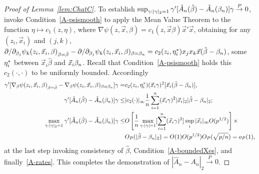\documentclass{article}
\theoremstyle{remark}
\begin{document}
\begin{proof}[Proof of Lemma~\ref{lem:ChatC}]
To establish $\sup_{\gamma: |\gamma|_{2}=1}\gamma'[\hat{A}_{n}(\hat\beta) - \hat{A}_{n}(\beta_{n }) ]\gamma  \stackrel{P}{\rightarrow} 0$,  invoke Condition~\ref{A-psismooth} to apply the Mean Value Theorem to the function $\eta \mapsto c_{1}(z, \eta)$, where $\nabla \psi(z, \vec{x}, \beta)  = c_{1}(z, \vec{x}\beta) \vec{x}'\vec{x}$, obtaining for any $(z_{i}, \vec{x}_{i})$ and $(j,k)$, $\partial/\partial_{\beta_{j}}\psi_{k}(z_{i}, \vec{x}_{i},\beta)_{\beta = \hat\beta} - \partial/\partial_{\beta_{j}}\psi_{k}(z_{i}, \vec{x}_{i}, \beta)_{\beta = \beta_{n }}  =  c_{2}(z_{i}, \eta^{*}_{i})x_{j}x_{k}\vec{x}(\hat\beta - \beta_{n })$, some $\eta^{*}_{i}$ between $\vec{x}_{i}\hat\beta$ and $\vec{x}_{i}\beta_{n }$. Recall that Condition~\ref{A-psismooth} holds this $c_{2}(\cdot, \cdot)$ to be uniformly bounded. Accordingly
\begin{align}
  \gamma'[\nabla_{\beta} \psi(z_{i}, \vec{x}_{i},\beta)_{\beta = \hat\beta} - \nabla_{\beta} \psi (z_{i}, \vec{x}_{i},\beta)_{\beta = \beta_{n }}]\gamma =& c_{2}(z_{i}, \eta^{*}_{i}) (\vec{x}_{i}\gamma)^{2} [\vec{x}_{i}(\hat\beta - \beta_{n })], \nonumber \\
\gamma'[\hat{A}_{n}(\hat\beta) - \hat{A}_{n}(\beta_{n }) ]\gamma \leq & 
|c_{2}(\cdot)|_{\infty}\frac{1}{n} \sum_{i=1}^{n}(\vec{x}_{i}\gamma)^{2}
|\vec{x}_{i}|_{2} |\hat\beta - \beta_{n }|_{2}
\label{eq:21};\\
\max_{\gamma: |\gamma|_{2}=1} \gamma'[\hat{A}_{n}(\hat\beta) - \hat{A}_{n}(\beta_{n }) ]\gamma \leq & O \left[\frac{1}{n} 
\max_{\gamma :|\gamma|=1} [\sum_{i=1}^{n}(\vec{x}_{i}\gamma)^{2}] \sup_{i}|\vec{x}_{i}|_{\infty} O(p^{1/2})
\right] \times  \nonumber \\
& O_{P}(|\hat\beta - \beta_{n } |_{2})   = O(1)O(p^{1/2}) O_{P}(\sqrt{p/n}) = o_{P}(1), \nonumber
\end{align}
at the last step invoking consistency of $\hat\beta$,
Condition~\ref{A-boundedXes}, and finally~\ref{A-rates}. 
This completes the demonstration of $|\hat{A}_{n} - A_{n}|_{2} \stackrel{P}{\rightarrow} 0$.


\end{proof}
\end{document}
